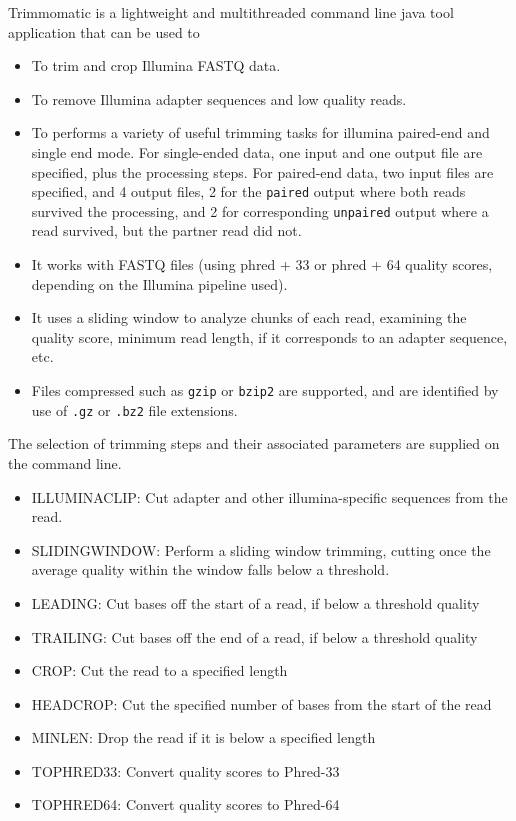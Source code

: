 \documentclass{article}
\begin{document}
Trimmomatic is a lightweight and multithreaded command line java tool application that can be used to
\begin{itemize}
 \item To trim and crop Illumina FASTQ data.
 \item To remove Illumina adapter sequences and low quality reads.
 \item To performs a variety of useful trimming tasks for illumina paired-end and single end mode.
For single-ended data, one input and one output file are specified, plus the processing steps. For paired-end data,
two input files are specified, and 4 output files, 2 for the \verb+paired+ output where both reads survived the processing,
and 2 for corresponding \verb+unpaired+ output where a read survived, but the partner read did not.
 \item It works with FASTQ files (using phred + 33 or phred + 64 quality scores, depending on the Illumina pipeline used).
 \item It uses a sliding window to analyze chunks of each read, examining the quality score, minimum read length, if it corresponds to an adapter sequence, etc. 
 \item Files compressed such as \verb+gzip+ or \verb+bzip2+ are supported, and are identified by use of \verb+.gz+ or \verb+.bz2+ file extensions.
\end{itemize}
The selection of trimming steps and their associated parameters are supplied on the command line.
\begin{itemize}
\item ILLUMINACLIP: Cut adapter and other illumina-specific sequences from the read.
\item SLIDINGWINDOW: Perform a sliding window trimming, cutting once the average quality within the window falls below a threshold.
\item LEADING: Cut bases off the start of a read, if below a threshold quality
\item TRAILING: Cut bases off the end of a read, if below a threshold quality
\item CROP: Cut the read to a specified length
\item HEADCROP: Cut the specified number of bases from the start of the read
\item MINLEN: Drop the read if it is below a specified length
\item TOPHRED33: Convert quality scores to Phred-33
\item TOPHRED64: Convert quality scores to Phred-64
\end{itemize}
\end{document}
